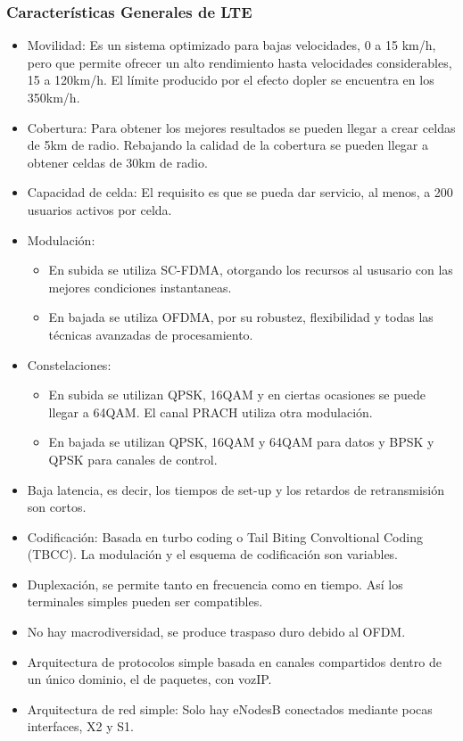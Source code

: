 	\subsubsection{Características Generales de \acrshort{LTE}}
	\label{ssub:caracLTE}
		\begin{itemize}
			\item Movilidad: Es un sistema optimizado para bajas velocidades, 0 a 15 km/h, pero que permite ofrecer un alto rendimiento hasta velocidades considerables, 15 a 120km/h. El límite producido por el efecto dopler se encuentra en los 350km/h.
			\item Cobertura: Para obtener los mejores resultados se pueden llegar a crear celdas de 5km de radio. Rebajando la calidad de la cobertura se pueden llegar a obtener celdas de 30km de radio.
			\item Capacidad de celda: El requisito es que se pueda dar servicio, al menos, a 200 usuarios activos por celda.
			\item Modulación:
			\begin{itemize}
				\item En subida se utiliza SC-\acrshort{FDMA}, otorgando los recursos al ususario con las mejores condiciones instantaneas.
				\item En bajada se utiliza O\acrshort{FDMA}, por su robustez, flexibilidad y todas las técnicas avanzadas de procesamiento.
			\end{itemize}
			\item Constelaciones:
			\begin{itemize}
				\item En subida se utilizan QPSK, 16QAM y en ciertas ocasiones se puede llegar a 64QAM. El canal \acrshort{PRACH} utiliza otra modulación.
				\item En bajada se utilizan QPSK, 16QAM y 64QAM para datos y BPSK y QPSK  para canales de control.
			\end{itemize}
			\item Baja latencia, es decir, los tiempos de set-up y los retardos de retransmisión son cortos.
			\item Codificación: Basada en turbo coding o Tail Biting Convoltional Coding (\acrshort{TBCC}). La modulación y el esquema de codificación son variables.
			\item Duplexación, se permite tanto en frecuencia como en tiempo. Así los terminales simples pueden ser compatibles.
			\item No hay macrodiversidad, se produce traspaso duro debido al OFDM.
			\item Arquitectura de protocolos simple basada en canales compartidos dentro de un único dominio, el de paquetes, con vozIP.
			\item Arquitectura de red simple: Solo hay eNodesB conectados mediante pocas interfaces, X2 y S1.
		\end{itemize}
